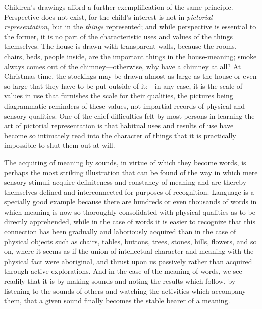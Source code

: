 \documentclass[showtrims,ustradepaper]{memoir}
\begin{document}

Children's drawings afford a further exemplification of the same
principle. Perspective does not exist, for the child's interest is not
in \emph{pictorial representation}, but in the \emph{things}
represented; and while perspective is essential to the former, it is no
part of the characteristic uses and values of the things themselves. The
house
is drawn with transparent walls, because the rooms, chairs, beds, people
inside, are the important things in the house-meaning; smoke always
comes out of the chimney---otherwise, why have a chimney at all? At
Christmas time, the stockings may be drawn almost as large as the house
or even so large that they have to be put outside of it:---in any case,
it is the scale of values in use that furnishes the scale for their
qualities, the pictures being diagrammatic reminders of these values,
not impartial records of physical and sensory qualities. One of the
chief difficulties felt by most persons in learning the art of pictorial
representation is that habitual uses and results of use have become so
intimately read into the character of things that it is practically
impossible to shut them out at will.


The acquiring of meaning by sounds, in virtue of which they become
words, is perhaps the most striking illustration that can be found of
the way in which mere sensory stimuli acquire definiteness and constancy
of meaning and are thereby themselves defined and interconnected for
purposes of recognition. Language is a specially good example because
there are hundreds or even thousands of words in which meaning is now so
thoroughly consolidated with physical qualities as to be directly
apprehended, while in the case of words it is easier to recognize that
this connection has been gradually and laboriously acquired than in the
case of physical objects such as chairs, tables, buttons, trees, stones,
hills, flowers, and so on, where it seems as if the union of
intellectual character and meaning with the physical fact were
aboriginal, and thrust upon us passively rather than acquired through
active explorations. And in the case of the meaning of words, we see
readily that it is by
making
sounds and noting the results which follow, by listening to the sounds
of others and watching the activities which accompany them, that a given
sound finally becomes the stable bearer of a meaning.
\end{document}
